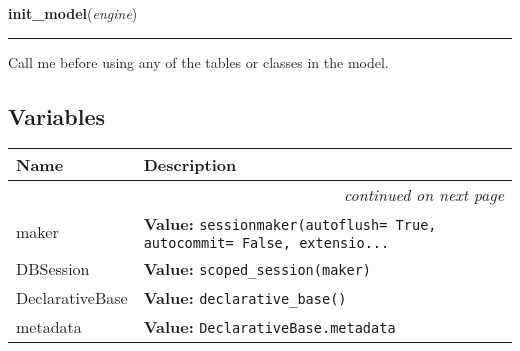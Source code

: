     \label{saip:model:init_model}

    \vspace{0.5ex}

\hspace{.8\funcindent}\begin{boxedminipage}{\funcwidth}

    \raggedright \textbf{init\_model}(\textit{engine})

    \vspace{-1.5ex}

    \rule{\textwidth}{0.5\fboxrule}
\setlength{\parskip}{2ex}
    Call me before using any of the tables or classes in the model.

\setlength{\parskip}{1ex}
    \end{boxedminipage}



  \subsection{Variables}

    \vspace{-1cm}
\hspace{\varindent}\begin{longtable}{|p{\varnamewidth}|p{\vardescrwidth}|l}
\cline{1-2}
\cline{1-2} \centering \textbf{Name} & \centering \textbf{Description}& \\
\cline{1-2}
\endhead\cline{1-2}\multicolumn{3}{r}{\small\textit{continued on next page}}\\\endfoot\cline{1-2}
\endlastfoot\raggedright m\-a\-k\-e\-r\- & \raggedright \textbf{Value:} 
{\tt sessionmaker(autoflush= True, autocommit= False, extensio\texttt{...}}&\\
\cline{1-2}
\raggedright D\-B\-S\-e\-s\-s\-i\-o\-n\- & \raggedright \textbf{Value:} 
{\tt scoped\_session(maker)}&\\
\cline{1-2}
\raggedright D\-e\-c\-l\-a\-r\-a\-t\-i\-v\-e\-B\-a\-s\-e\- & \raggedright \textbf{Value:} 
{\tt declarative\_base()}&\\
\cline{1-2}
\raggedright m\-e\-t\-a\-d\-a\-t\-a\- & \raggedright \textbf{Value:} 
{\tt DeclarativeBase.metadata}&\\
\cline{1-2}
\end{longtable}


